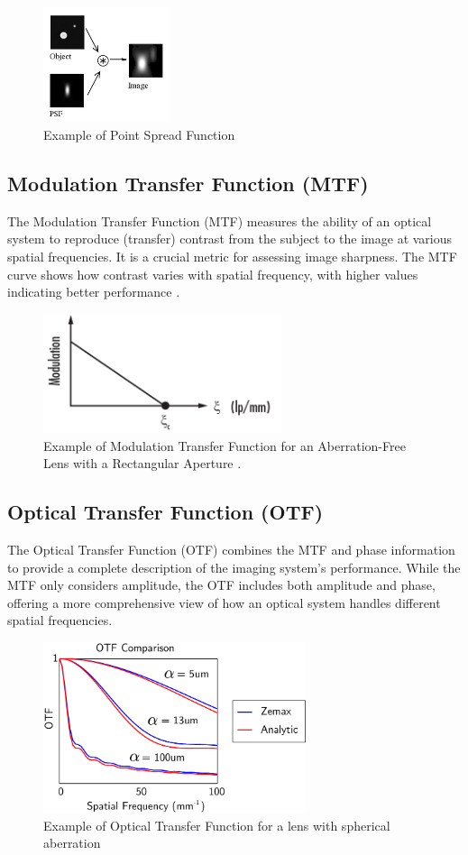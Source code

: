 \begin{figure}[h]
\centering
\includegraphics[width=3.7cm]{Images/psf.png}
\caption{Example of Point Spread Function \cite{PSF}}
\label{fig:psf}
\end{figure}

\subsection{Modulation Transfer Function (MTF)}
The Modulation Transfer Function (MTF) measures the ability of an optical system to reproduce (transfer) contrast from the subject to the image at various spatial frequencies. It is a crucial metric for assessing image sharpness. The MTF curve shows how contrast varies with spatial frequency, with higher values indicating better performance \cite{MTF}.

\begin{figure}[h]
\centering
\includegraphics[height=3.5cm]{Images/MTF_example.png}
\caption{Example of Modulation Transfer Function for an Aberration-Free Lens with a Rectangular Aperture \cite{MTFimage}.}
\label{fig:mtf}
\end{figure}

\subsection{Optical Transfer Function (OTF)}
The Optical Transfer Function (OTF) combines the MTF and phase information to provide a complete description of the imaging system's performance. While the MTF only considers amplitude, the OTF includes both amplitude and phase, offering a more comprehensive view of how an optical system handles different spatial frequencies.

\begin{figure}[h]
\centering
\includegraphics[height=5cm]{Images/OTF_example.png}
\caption{Example of Optical Transfer Function for a lens with spherical aberration \cite{OTFimage}}
\label{fig:otf}
\end{figure}

